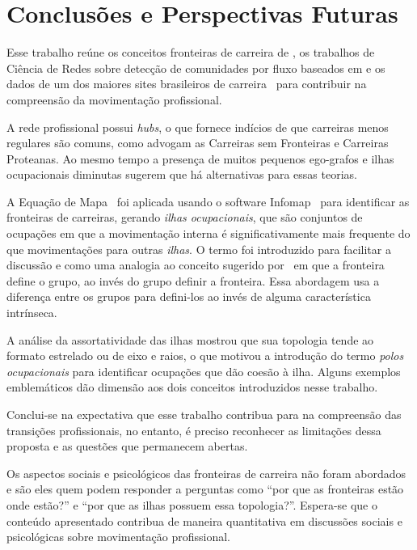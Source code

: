 \documentclass[
  article,
  11pt,
  a4paper,
  english,
  brazil,
  sumario=tradicional]{abntex2}
\begin{document}
\section{Conclusões e Perspectivas Futuras}

Esse trabalho reúne os conceitos fronteiras de carreira de , os trabalhos de Ciência de Redes sobre detecção de comunidades por fluxo baseados em \cite{Rosvall2009-sd} e os dados de um dos maiores sites brasileiros de carreira~\cite{VAGAS_Tecnologia2014-yv} para contribuir na compreensão da movimentação profissional.

A rede profissional possui \textit{hubs}, o que fornece indícios de que carreiras menos regulares são comuns, como advogam as Carreiras sem Fronteiras e Carreiras Proteanas. Ao mesmo tempo a presença de muitos pequenos ego-grafos e ilhas ocupacionais diminutas sugerem que há alternativas para essas teorias.

A Equação de Mapa~\cite{Rosvall2009-sd} foi aplicada usando o software Infomap~\cite{Edler2012-hh} para identificar as fronteiras de carreiras, gerando \textit{ilhas ocupacionais}, que são conjuntos de ocupações em que a movimentação interna é significativamente mais frequente do que movimentações para outras \textit{ilhas}. O termo foi introduzido para facilitar a discussão e como uma analogia ao conceito sugerido por~\cite{Abbott1995-ft} em que a fronteira define o grupo, ao invés do grupo definir a fronteira. Essa abordagem usa a diferença entre os grupos para defini-los ao invés de alguma característica intrínseca. 

A análise da assortatividade das ilhas mostrou que sua topologia tende ao formato estrelado ou de eixo e raios, o que motivou a introdução do termo \textit{polos ocupacionais} para identificar ocupações que dão coesão à ilha. Alguns exemplos emblemáticos dão dimensão aos dois conceitos introduzidos nesse trabalho.

Conclui-se na expectativa que esse trabalho contribua para na compreensão das transições profissionais, no entanto, é preciso reconhecer as limitações dessa proposta e as questões que permanecem abertas.

Os aspectos sociais e psicológicos das fronteiras de carreira não foram abordados e são eles quem podem responder a perguntas como \enquote{por que as fronteiras estão onde estão?} e \enquote{por que as ilhas possuem essa topologia?}. Espera-se que o conteúdo apresentado contribua de maneira quantitativa em discussões sociais e psicológicas sobre movimentação profissional.
\end{document}

